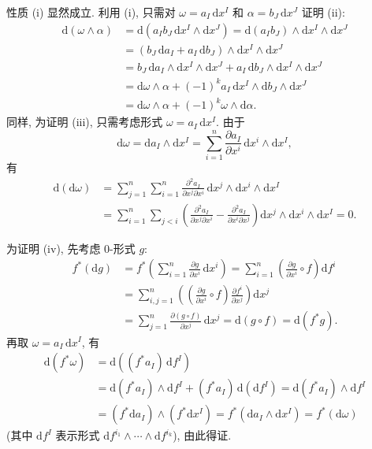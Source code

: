 \begin{RiemannProof}
性质 (i) 显然成立. 利用 (i), 只需对 $\omega=a_I\,\mathrm{d}x^I$ 和 $\alpha=b_J\,\mathrm{d}x^J$ 证明 (ii):
\begin{align*}
  \mathrm{d}(\omega\wedge\alpha)
  &=\mathrm{d}(a_Ib_J\,\mathrm{d}x^I\wedge\mathrm{d}x^J)
    =\mathrm{d}(a_Ib_J)\wedge\mathrm{d}x^I\wedge\mathrm{d}x^J\\
  &=(b_J\,\mathrm{d}a_I+a_I\,\mathrm{d}b_J)\wedge\mathrm{d}x^I\wedge\mathrm{d}x^J\\
  &=b_J\,\mathrm{d}a_I\wedge\mathrm{d}x^I\wedge\mathrm{d}x^J
    +a_I\,\mathrm{d}b_J\wedge\mathrm{d}x^I\wedge\mathrm{d}x^J\\
  &=\mathrm{d}\omega\wedge\alpha+(-1)^ka_I\,\mathrm{d}x^I\wedge\mathrm{d}b_J\wedge\mathrm{d}x^J\\
  &=\mathrm{d}\omega\wedge\alpha+(-1)^k\omega\wedge\mathrm{d}\alpha.
\end{align*}
同样, 为证明 (iii), 只需考虑形式 $\omega=a_I\,\mathrm{d}x^I$. 由于
\[
  \mathrm{d}\omega=\mathrm{d}a_I\wedge\mathrm{d}x^I
  =\sum_{i=1}^n\frac{\partial a_I}{\partial x^i}\,\mathrm{d}x^i\wedge\mathrm{d}x^I,
\]
有
\begin{align*}
  \mathrm{d}(\mathrm{d}\omega)
  &=\sum_{j=1}^n\sum_{i=1}^n\frac{\partial^2a_I}{\partial x^j\partial x^i}
    \,\mathrm{d}x^j\wedge\mathrm{d}x^i\wedge\mathrm{d}x^I\\
  &=\sum_{i=1}^n\sum_{j<i}\left(\frac{\partial^2a_I}{\partial x^j\partial x^i}
    -\frac{\partial^2a_I}{\partial x^i\partial x^j}\right)
    \mathrm{d}x^j\wedge\mathrm{d}x^i\wedge\mathrm{d}x^I=0.
\end{align*}

为证明 (iv), 先考虑 0-形式 $g$:
\begin{align*}
  f^*(\mathrm{d}g)
  &=f^*\left(\sum_{i=1}^n\frac{\partial g}{\partial x^i}\,\mathrm{d}x^i\right)
    =\sum_{i=1}^n\left(\frac{\partial g}{\partial x^i}\circ f\right)\mathrm{d}f^i\\
  &=\sum_{i,j=1}^n\left(\left(\frac{\partial g}{\partial x^i}\circ f\right)
    \frac{\partial f^i}{\partial x^j}\right)\mathrm{d}x^j\\
  &=\sum_{j=1}^n\frac{\partial(g\circ f)}{\partial x^j}\,\mathrm{d}x^j
    =\mathrm{d}(g\circ f)=\mathrm{d}(f^*g).
\end{align*}
再取 $\omega=a_I\,\mathrm{d}x^I$, 有
\begin{align*}
  \mathrm{d}(f^*\omega)&=\mathrm{d}((f^*a_I)\,\mathrm{d}f^I)\\
  &=\mathrm{d}(f^*a_I)\wedge\mathrm{d}f^I+(f^*a_I)\,\mathrm{d}(\mathrm{d}f^I)
    =\mathrm{d}(f^*a_I)\wedge\mathrm{d}f^I\\
  &=(f^*\mathrm{d}a_I)\wedge(f^*\mathrm{d}x^I)
    =f^*(\mathrm{d}a_I\wedge\mathrm{d}x^I)=f^*(\mathrm{d}\omega)
\end{align*}
(其中 $\mathrm{d}f^I$ 表示形式 $\mathrm{d}f^{i_1}\wedge\cdots\wedge\mathrm{d}f^{i_k}$), 由此得证.
\end{RiemannProof}

